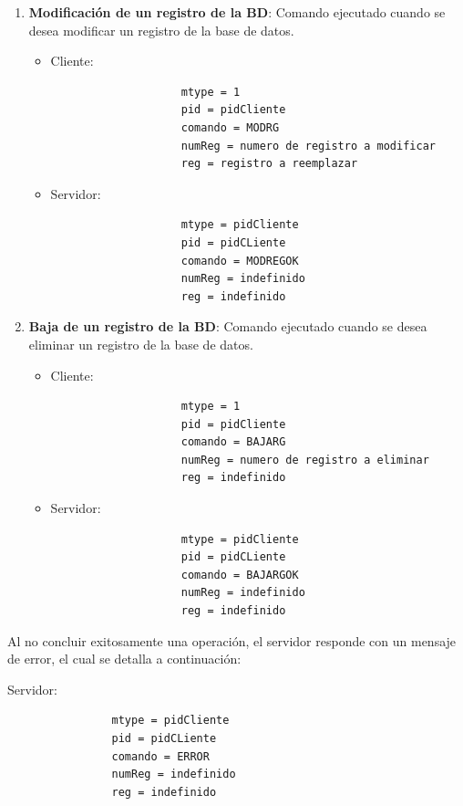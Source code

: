 \documentclass[a4paper,10pt]{article}
\begin{document}
\begin{enumerate}
		\item{\bf Modificaci\'on de un registro de la BD}: Comando ejecutado cuando se desea modificar un registro de la base de datos.
			\begin{itemize}
				\item Cliente:
				\begin{verbatim}
					mtype = 1
					pid = pidCliente
					comando = MODRG 
					numReg = numero de registro a modificar
					reg = registro a reemplazar
				\end{verbatim}
				\item Servidor:
				\begin{verbatim}
					mtype = pidCliente 
					pid = pidCLiente
					comando = MODREGOK
					numReg = indefinido
					reg = indefinido
				\end{verbatim}
			\end{itemize}

		\item{\bf Baja de un registro de la BD}: Comando ejecutado cuando se desea eliminar un registro de la base de datos.
			\begin{itemize}
				\item Cliente:
				\begin{verbatim}
					mtype = 1
					pid = pidCliente
					comando = BAJARG 
					numReg = numero de registro a eliminar
					reg = indefinido
				\end{verbatim}
				\item Servidor:
				\begin{verbatim}
					mtype = pidCliente 
					pid = pidCLiente
					comando = BAJARGOK
					numReg = indefinido
					reg = indefinido
				\end{verbatim}
			\end{itemize}
		\end{enumerate}


	Al no concluir exitosamente una operaci\'on, el servidor responde con un mensaje de error, el cual se detalla a continuaci\'on:

		Servidor:
			\begin{verbatim}
				mtype = pidCliente 
				pid = pidCLiente
				comando = ERROR
				numReg = indefinido
				reg = indefinido
			\end{verbatim}
\end{document}
